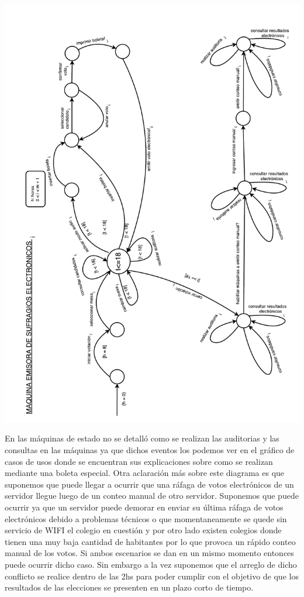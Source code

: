 \documentclass[spanish, 10pt,a4paper]{article}
\numberwithin{equation}{section} %
\begin{document}
\vspace{\baselineskip}
    \begin{center}
                \includegraphics[scale=0.75, page=1]{imagenes/fsm/FSMMaquinaEmisoradeSufragios.pdf}
                \\
                \vspace{1pt}
                \footnotesize\textit{}
        \end{center}
\vspace{\baselineskip}
En las máquinas de estado no se detalló como se realizan las auditorias y las consultas en las máquinas ya que dichos eventos los podemos ver en el gráfico de casos de usos donde se encuentran sus explicaciones sobre como se realizan mediante una boleta especial.
Otra aclaración más sobre este diagrama es que suponemos que puede llegar a ocurrir que una ráfaga de votos electrónicos de un servidor llegue luego de un conteo manual de otro servidor. Suponemos que puede ocurrir ya que un servidor puede demorar en enviar su última ráfaga de votos electrónicos debido a problemas técnicos o que momentaneamente se quede sin servicio de WIFI el colegio en cuestión y por otro lado existen colegios donde tienen una muy baja cantidad de habitantes por lo que provoca un rápido conteo manual de los votos. Si ambos escenarios se dan en un mismo momento entonces puede ocurrir dicho caso. Sin embargo a la vez suponemos que el arreglo de dicho conflicto se realice dentro de las 2hs para poder cumplir con el objetivo de que los resultados de las elecciones se presenten en un plazo corto de tiempo.
\end{document}

